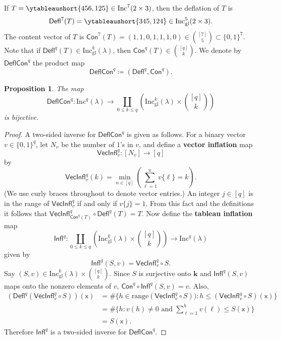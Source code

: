 \documentclass[12pt]{amsart}
\newcommand{\x}{\ensuremath{\mathsf{x}}}
\newtheorem{proposition}[theorem]{Proposition}
\theoremstyle{definition}
\newenvironment{example}
  {\pushQED{\qed}\renewcommand{\qedsymbol}{$\diamondsuit$}\examplex}
  {\popQED\endexamplex}
\theoremstyle{remark}
\numberwithin{equation}{section}
\newcommand{\inc}{\ensuremath{\mathrm{Inc}}}
\newcommand{\incgl}{\inc_{\mathrm{gl}}}
\newcommand{\deflate}{\ensuremath{\mathsf{Defl}}}
\newcommand{\inflate}{\ensuremath{\mathsf{VecInfl}}}
\newcommand{\tinflate}{\ensuremath{\mathsf{Infl}}}
\newcommand{\content}{\ensuremath{\mathsf{Con}}}
\newcommand{\compress}{\ensuremath{\mathsf{DeflCon}}}
\begin{document}
\begin{example}\label{ex:deflate}
If $T = \ytableaushort{456,125} \in \inc^7(2 \times 3)$, then the deflation of $T$ is \[\deflate^7(T) = \ytableaushort{345,124} \in \incgl^5(2 \times 3).\] The content vector of $T$ is $\content^7(T) = (1,1,0,1,1,1,0) \in \binom{[7]}{5} \subset \{0,1\}^7$.
\end{example}
Note that if $\deflate^q(T) \in \incgl^k(\lambda)$, then $\content^q(T) \in \binom{[q]}{k}$. We denote by $\compress^q$ the product map
\[
\compress^q \coloneqq (\deflate^q,\content^q).
\] 
\begin{proposition}\label{prop:compressbijective} The map 
\[
\compress^q : \inc^q(\lambda) \to \coprod_{0 \leq k \leq q} \left( \incgl^k(\lambda) \times \binom{[q]}{k} \right)
\]
 is bijective.
\end{proposition}
\begin{proof}
A two-sided inverse for $\compress^q$ is given as follows. 
For a binary vector $v \in \{0,1\}^{q}$, let $N_v$ be the number of $1$'s in $v$, and define a {\bf vector inflation} map \[\inflate^q_v : [N_v] \to [q]\] by
\[ \inflate^q_v(k) = \min_{n \in [q]} \left( \sum_{\ell = 1}^n v\lbrace \ell \rbrace = k \right).\] (We use curly braces throughout to denote vector entries.) An integer $j \in [q]$ is in the range of $\inflate^q_v$ if and only if $v\lbrace j \rbrace = 1$. From this fact and the definitions it follows that $\inflate^q_{\content^q(T)} \circ \deflate^q(T) = T$. Now define the {\bf tableau inflation} map 
\[
\tinflate^q : \coprod_{0 \leq k \leq q} \left( \incgl^k(\lambda) \times \binom{[q]}{k} \right) \to \inc^q(\lambda)
\]
given by 
\[
\tinflate^q(S,v) = \inflate^q_v \circ S.
\]
Say $(S,v) \in \incgl^k(\lambda) \times \binom{[q]}{k}$. Since $S$ is surjective onto $\mathbf{k}$ and $\tinflate^q(S,v)$ maps onto the nonzero elements of $v$, $\content^q \circ \tinflate^q(S,v) = v$.  Also,
\begin{align*}
 (\deflate^q(\inflate^q_v \circ S))(\x) &= \# \{ h \in \mathrm{range}(\inflate^q_v \circ S)): h \leq (\inflate^q_v \circ S)(\x) \} \\  
 &= \# \{ h: v(h) \neq 0 \text{ and } \sum_{\ell = 1}^h v(\ell) \leq S(\x)  \} \\
 &= S(\x).
\end{align*}
Therefore $\tinflate^q$ is a two-sided inverse for $\compress^q$.
\end{proof} 
\end{document}
